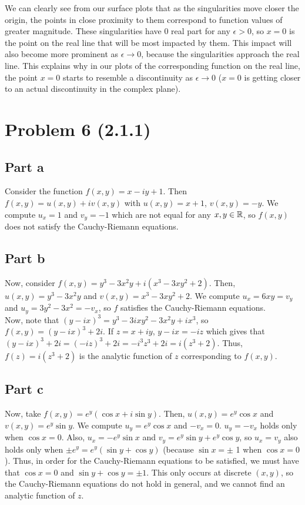\documentclass{article}
\begin{document}
We can clearly see from our surface plots that as the singularities move closer the origin, the points in close proximity to them correspond to function values of greater magnitude. These singularities have 0 real part for any $\epsilon>0$, so $x=0$ is the point on the real line that will be most impacted by them. This impact will also become more prominent as $\epsilon\to 0$, because the singularities approach the real line. This explains why in our plots of the corresponding function on the real line, the point $x=0$ starts to resemble a discontinuity as $\epsilon\to 0$ ($x=0$ is getting closer to an actual discontinuity in the complex plane). 
\section{Problem 6 (2.1.1)}
\subsection{Part a}
Consider the function $f(x,y)=x-iy+1$. Then $f(x,y)=u(x,y)+iv(x,y)$ with $u(x,y)=x+1$, $v(x,y)=-y$. We compute $u_x=1$ and $v_y=-1$ which are not equal for any $x,y\in\mathbb{R}$, so $f(x,y)$ does not satisfy the Cauchy-Riemann equations.
\subsection{Part b}
Now, consider $f(x,y)=y^3-3x^2y+i(x^3-3xy^2+2)$. Then, $u(x,y)=y^3-3x^2y$ and $v(x,y)=x^3-3xy^2+2$. We compute $u_x=6xy=v_y$ and $u_y=3y^2-3x^2=-v_x$, so $f$ satisfies the Cauchy-Riemann equations. \\
Now, note that $(y-ix)^3=y^3-3ixy^2-3x^2y+ix^3$, so $f(x,y)=(y-ix)^3+2i$. If $z=x+iy$, $y-ix=-iz$ which gives that $(y-ix)^3+2i=(-iz)^3+2i=-i^3z^3+2i=i(z^3+2)$. Thus, $f(z)=i(z^3+2)$ is the analytic function of $z$ corresponding to $f(x,y)$.
\subsection{Part c}
Now, take $f(x,y)=e^y(\cos x+i\sin y)$. Then, $u(x,y)=e^y\cos x$ and $v(x,y)=e^y\sin y$. We compute $u_y=e^y\cos x$ and $-v_x=0$. $u_y=-v_x$ holds only when $\cos x=0$. Also, $u_x=-e^y\sin x$ and $v_y = e^y\sin y +e^y\cos y$, so $u_x=v_y$ also holds only when $\pm e^y = e^y(\sin y+\cos y)$ (because $\sin x=\pm$ 1 when $\cos x=0$). Thus, in order for the Cauchy-Riemann equations to be satisfied, we must have that $\cos x=0$ and $\sin y+\cos y=\pm1$. This only occurs at discrete $(x,y)$, so the Cauchy-Riemann equations do not hold in general, and we cannot find an analytic function of $z$.
\end{document}
